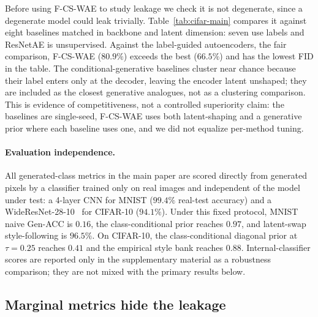 \documentclass[letterpaper]{article} %
\newcommand{\ours}{F-CS-WAE}
\begin{document}
Before using \ours{} to study leakage we check it is not degenerate, since a
degenerate model could leak trivially. Table~\ref{tab:cifar-main} compares it
against eight baselines matched in backbone and latent dimension: seven use
labels and ResNetAE is unsupervised. Against the
label-guided autoencoders, the fair comparison, \ours{} ($80.9\%$) exceeds the
best ($66.5\%$) and has the lowest FID in the table. The
conditional-generative baselines cluster near chance because their label
enters only at the decoder, leaving the encoder latent unshaped; they are
included as the closest generative analogues, not as a clustering
comparison. This is evidence of competitiveness, not a controlled
superiority claim: the baselines are single-seed, \ours{} uses both
latent-shaping and a generative prior where each baseline uses one, and we
did not equalize per-method tuning.

\paragraph{Evaluation independence.}
All generated-class metrics in the main paper are scored directly from
generated pixels by a classifier trained only on real images and independent
of the model under test: a 4-layer CNN for MNIST ($99.4\%$ real-test
accuracy) and a WideResNet-28-10~\citep{zagoruyko2016wide} for CIFAR-10
($94.1\%$). Under this fixed
protocol, MNIST naive Gen-ACC is $0.16$, the class-conditional prior reaches
$0.97$, and latent-swap style-following is $96.5\%$. On CIFAR-10, the
class-conditional diagonal prior at $\tau{=}0.25$ reaches $0.41$ and the
empirical style bank reaches $0.88$. Internal-classifier scores are reported
only in the supplementary material as a robustness comparison; they are not
mixed with the primary results below.

\subsection{Marginal metrics hide the leakage}
\label{sec:exp-hide}
\end{document}
